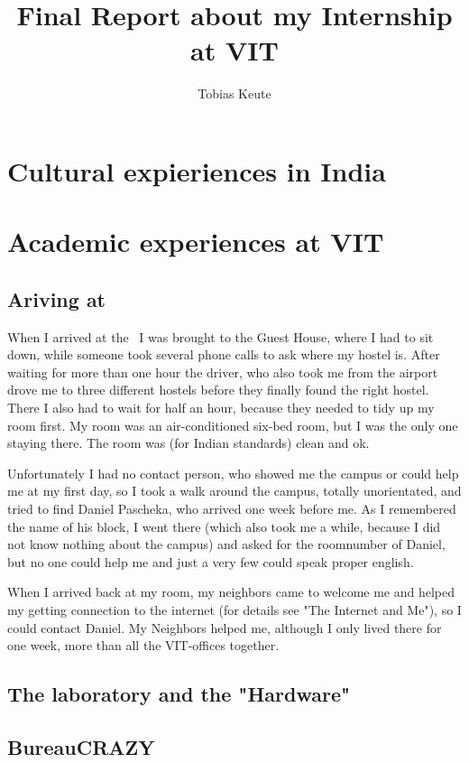 \documentclass[11pt,english,a4paper,]{scrartcl}
\title{Final Report about my Internship at VIT}
\author{Tobias Keute}
\begin{document}
\maketitle
\tableofcontents
\section{Cultural expieriences in India}
\section{Academic experiences at VIT}
\subsection{Ariving at }
When I arrived at the \vit\, I was brought to the Guest House, where I had to sit down, while someone took several phone calls to ask where my hostel is. After waiting for more than one hour the driver, who also took me from the airport drove me to three different hostels before they finally found the right hostel. There I also had to wait for half an hour, because they needed to tidy up my room first. My room was an air-conditioned six-bed room, but I was the only one staying there. The room was (for Indian standards) clean and ok.

\bigskip
Unfortunately I had no contact person, who showed me the campus or could help me at my first day, so I took a walk around the campus, totally unorientated, and tried to find Daniel Pascheka, who arrived one week before me. As I remembered the name of his block, I went there (which also took me a while, because I did not know nothing about the campus) and asked for the roomnumber of Daniel, but no one could help me and just a very few could speak proper english.

\bigskip
When I arrived back at my room, my neighbors came to welcome me and helped my getting connection to the internet (for details see "The Internet and Me"), so I could contact Daniel. My Neighbors helped me, although I only lived there for one week, more than all the VIT-offices together. 

\bigskip

\subsection{The laboratory and the "Hardware"}
\subsection{BureauCRAZY}
\end{document}
